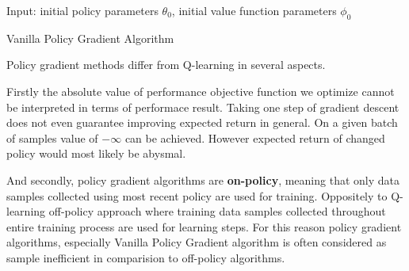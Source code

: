 \begin{algorithm}[H]
  Input: initial policy parameters $\theta_0$, initial value function parameters $\phi_0$
  
  
  \caption{Vanilla Policy Gradient Algorithm}
  \label{Vanilla}
\end{algorithm}

Policy gradient methods differ from Q-learning in several aspects.

Firstly the absolute value of performance objective function we optimize cannot be interpreted in terms of performace result.
Taking one step of gradient descent does not even guarantee improving expected return in general.
On a given batch of samples value of $-\infty$ can be achieved. 
However expected return of changed policy would most likely be abysmal.

And secondly, policy gradient algorithms are \textbf{on-policy}, meaning that only data samples collected using most recent policy are used for training.
Oppositely to Q-learning off-policy approach where training data samples collected throughout entire training process are used for learning steps.
For this reason policy gradient algorithms, especially Vanilla Policy Gradient algorithm is often considered as sample inefficient in comparision to off-policy algorithms.


